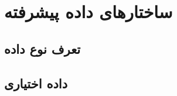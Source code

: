 
\chapter{ساختارهای داده پیشرفته}


\section{تعرف نوع داده}

% 
% 
% 
% 
% 
% 
% 
% 
% 
% 
% 

\section{داده اختیاری}

% 
% 
% 

